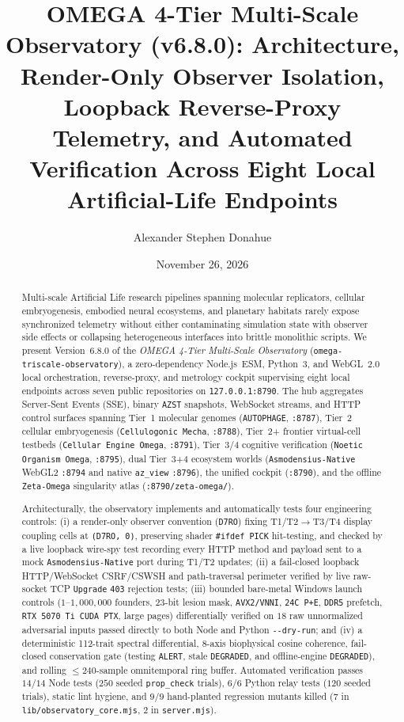 \documentclass[11pt,reqno]{amsart}
\title[OMEGA 4-Tier Multi-Scale Observatory (v6.8.0)]{OMEGA 4-Tier Multi-Scale Observatory (v6.8.0): Architecture, Render-Only Observer Isolation, Loopback Reverse-Proxy Telemetry, and Automated Verification Across Eight Local Artificial-Life Endpoints}
\author{Alexander Stephen Donahue}
\date{November 26, 2026}
\theoremstyle{definition}
\newcommand{\code}[1]{{\footnotesize\nolinkurl{#1}}}
\begin{document}
\begin{abstract}
Multi-scale Artificial Life research pipelines spanning molecular replicators, cellular embryogenesis, embodied neural ecosystems, and planetary habitats rarely expose synchronized telemetry without either contaminating simulation state with observer side effects or collapsing heterogeneous interfaces into brittle monolithic scripts. We present Version~6.8.0 of the \emph{OMEGA 4-Tier Multi-Scale Observatory} (\code{omega-triscale-observatory}), a zero-dependency Node.js~ESM, Python~3, and WebGL~2.0 local orchestration, reverse-proxy, and metrology cockpit supervising eight local endpoints across seven public repositories on \code{127.0.0.1:8790}. The hub aggregates Server-Sent Events (SSE), binary \code{AZST} snapshots, WebSocket streams, and HTTP control surfaces spanning Tier~1 molecular genomes (\code{AUTOPHAGE}, \code{:8787}), Tier~2 cellular embryogenesis (\code{Cellulogonic Mecha}, \code{:8788}), Tier~2+ frontier virtual-cell testbeds (\code{Cellular Engine Omega}, \code{:8791}), Tier~3/4 cognitive verification (\code{Noetic Organism Omega}, \code{:8795}), dual Tier~3+4 ecosystem worlds (\code{Asmodensius-Native} WebGL2 \code{:8794} and native \code{az\_view} \code{:8796}), the unified cockpit (\code{:8790}), and the offline \code{Zeta-Omega} singularity atlas (\code{:8790/zeta-omega/}).

Architecturally, the observatory implements and automatically tests four engineering controls: (i) a render-only observer convention (\code{D7RO}) fixing T1/T2$\to$T3/T4 display coupling cells at \code{(D7RO, 0)}, preserving shader \code{\#ifdef PICK} hit-testing, and checked by a live loopback wire-spy test recording every HTTP method and payload sent to a mock \code{Asmodensius-Native} port during T1/T2 updates; (ii) a fail-closed loopback HTTP/WebSocket CSRF/CSWSH and path-traversal perimeter verified by live raw-socket TCP \code{Upgrade} \code{403} rejection tests; (iii) bounded bare-metal Windows launch controls ($1$--$1{,}000{,}000$ founders, $23$-bit lesion mask, \code{AVX2/VNNI}, \code{24C P+E}, \code{DDR5} prefetch, \code{RTX 5070 Ti CUDA PTX}, large pages) differentially verified on $18$ raw unnormalized adversarial inputs passed directly to both Node and Python \code{--dry-run}; and (iv) a deterministic 112-trait spectral differential, 8-axis biophysical cosine coherence, fail-closed conservation gate (testing \code{ALERT}, stale \code{DEGRADED}, and offline-engine \code{DEGRADED}), and rolling $\le 240$-sample omnitemporal ring buffer. Automated verification passes $14/14$ Node tests ($250$ seeded \code{prop\_check} trials), $6/6$ Python relay tests ($120$ seeded trials), static lint hygiene, and $9/9$ hand-planted regression mutants killed ($7$ in \code{lib/observatory\_core.mjs}, $2$ in \code{server.mjs}).


\end{abstract}
\end{document}
